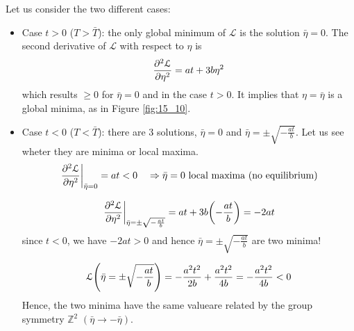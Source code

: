 \documentclass[../../Main/Main.tex]{subfiles}
\begin{document}
Let us consider the two different cases:
\begin{itemize}
\item Case \( t>0 \) (\( T> \bar{T}  \)):  the only global minimum of \( \mathcal{L} \) is the solution \( \bar{\eta }=0  \). The second derivative of \( \mathcal{L} \) with respect to \( \eta  \) is
\begin{equation*}
  \pdv[2]{\mathcal{L}}{\eta } = a t + 3 b \eta ^2
\end{equation*}
which results \( \ge 0 \) for \( \bar{\eta } = 0  \) and in the case \( t>0 \). It implies that \( \eta = \bar{\eta }  \) is a global minima, as in Figure \ref{fig:15_10}.



\item Case \( t<0 \) (\( T< \bar{T}  \)): there are 3 solutions, \( \bar{\eta } = 0  \) and \( \bar{\eta } = \pm \sqrt{- \frac{at}{b}}   \).
Let us see wheter they are minima or local maxima.
\begin{equation*}
  \eval{\pdv[2]{\mathcal{L}}{\eta } }_{\bar{\eta } =0 } = a t < 0 \quad \Rightarrow \bar{\eta } = 0 \text{ local maxima (no equilibrium)}
\end{equation*}

\begin{equation*}
  \eval{\pdv[2]{\mathcal{L}}{\eta } }_{\bar{\eta } = \pm \sqrt{- \frac{at}{b}}  } = a t + 3 b \qty(- \frac{at}{b}) = -2at
\end{equation*}
since \( t<0 \), we have \( -2at >0 \) and hence \( \bar{\eta } = \pm \sqrt{- \frac{at}{b}}   \) are two minima!


\begin{equation*}
  \mathcal{L} \qty(\bar{\eta }  = \pm \sqrt{- \frac{at}{b}} ) = - \frac{a^2 t^2}{2b} + \frac{a^2 t^2}{4b} = - \frac{a^2 t^2}{4b} < 0
\end{equation*}
Hence, the two minima have the same valueare related by the group symmetry \( \mathbb{Z}^2 \)  \( (\bar{\eta } \rightarrow - \bar{\eta }  ) \).
\end{itemize}
\end{document}
